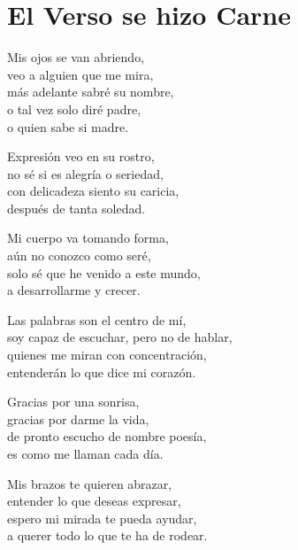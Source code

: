 \section*{El Verso se hizo Carne}
\label{VersoCarne}

\vspace{1em}
\begin{center}
Mis ojos se van abriendo,\\ 
veo a alguien que me mira,\\ 
más adelante sabré su nombre,\\ 
o tal vez solo diré padre,\\ 
o quien sabe si madre.

\vspace{1em} 
Expresión veo en su rostro,\\ 
no sé si es alegría o seriedad,\\ 
con delicadeza siento su caricia,\\ 
después de tanta soledad.

\vspace{1em} 
Mi cuerpo va tomando forma,\\ 
aún no conozco como seré,\\ 
solo sé que he venido a este mundo,\\ 
a desarrollarme y crecer.

\vspace{1em} 
Las palabras son el centro de mí,\\ 
soy capaz de escuchar, pero no de hablar,\\ 
quienes me miran con concentración,\\ 
entenderán lo que dice mi corazón.

\vspace{1em} 
Gracias por una sonrisa,\\ 
gracias por darme la vida,\\ 
de pronto escucho de nombre poesía,\\ 
es como me llaman cada día.

\vspace{1em} 
Mis brazos te quieren abrazar,\\ 
entender lo que deseas expresar,\\ 
espero mi mirada te pueda ayudar,\\ 
a querer todo lo que te ha de rodear.


\end{center}
